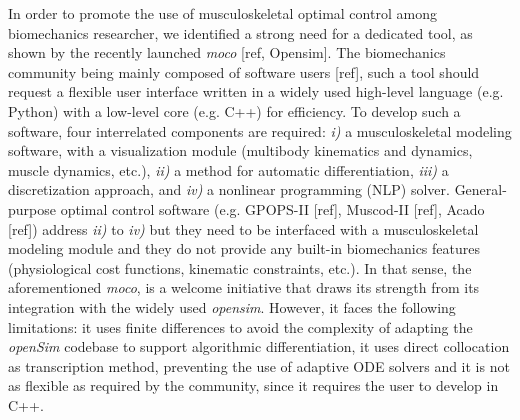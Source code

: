 In order to promote the use of musculoskeletal optimal control among biomechanics researcher, we identified a strong need for a dedicated tool, as shown by the recently launched \textit{moco} [ref, Opensim]. 
The biomechanics community being mainly composed of software users [ref], such a tool should request a flexible user interface written in a widely used high-level language (e.g. Python) with a low-level core (e.g. C++) for efficiency. 
To develop such a software, four interrelated components are required: \textit{i)} a musculoskeletal modeling software, with a visualization module (multibody kinematics and dynamics, muscle dynamics, etc.), \textit{ii)} a method for automatic differentiation, \textit{iii)} a discretization approach, and \textit{iv)} a nonlinear programming (NLP) solver. 
General-purpose optimal control software (e.g. GPOPS-II [ref], Muscod-II [ref], Acado [ref]) address \textit{ii)} to \textit{iv)} but they need to be interfaced with a musculoskeletal modeling module and they do not provide any built-in biomechanics features (physiological cost functions, kinematic constraints, etc.). 
In that sense, the aforementioned \textit{moco}, is a welcome initiative that draws its strength from its integration with the widely used \textit{opensim}.
However, it faces the following limitations: it uses finite differences to avoid the complexity of adapting the \textit{openSim} codebase to support algorithmic differentiation, it uses direct collocation as transcription method, preventing the use of adaptive ODE solvers and it is not as flexible as required by the community, since it requires the user to develop in C++. 




